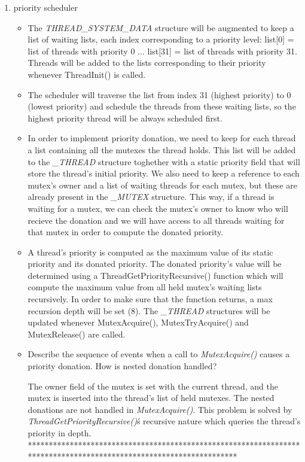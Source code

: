 \begin{enumerate}
    \item priority scheduler
        \begin{itemize}
			\item The \textit {THREAD_SYSTEM_DATA} structure will be augmented to keep a list of waiting lists, each index corresponding to a priority level:
				  list[0] = list of threads with priority 0 ... list[31] = list of threads with priority 31. Threads will be added to the lists corresponding
				  to their priority whenever ThreadInit() is called. 
			\item The scheduler will traverse the list from index 31 (highest priority) to 0 (lowest priority) and schedule the threads from these 
			      waiting lists, so the highest priority thread will be always scheduled first.
			\item In order to implement priority donation, we need to keep for each thread a list containing all the mutexes the thread holds. This list
				  will be added to the \textit{_THREAD} structure toghether with a static priority field that will store the thread's initial priority.
				  We also need to keep a reference to each mutex's owner and a list of waiting threads for each mutex, but these are
				  already present in the \textit{_MUTEX} structure. This way, if a thread is waiting for a mutex, we can check the mutex's owner
				  to know who will recieve the donation and we will have access to all threads waiting for that mutex in order to compute the donated priority.
			\item A thread's priority is computed as the maximum value of its static priority and its donated priority. 
				  The donated priority's value will be determined using a ThreadGetPriorityRecursive() function which will compute the maximum value 
				  from all held mutex's waiting lists recursively. In order to make sure that the function returns, a max recursion depth will be set (8).
				  The \textit{_THREAD} structures will be updated whenever MutexAcquire(), MutexTryAcquire() and MutexRelease() are called.
           
		   \item Describe the sequence of events when a call to \textit{MutexAcquire()} causes a priority donation.  How is nested donation handled?
			
					
				The owner field of the mutex is set with the current thread, and the mutex is inserted into the thread's list of held mutexes.
				The nested donations are not handled in \textit{MutexAcquire()}. This problem is solved by \textit{ThreadGetPriorityRecursive()}\'s recursive nature which queries the
				thread's priority in depth.
				*******************************************************************************************************************
            

\end{itemize}
\end{enumerate}
